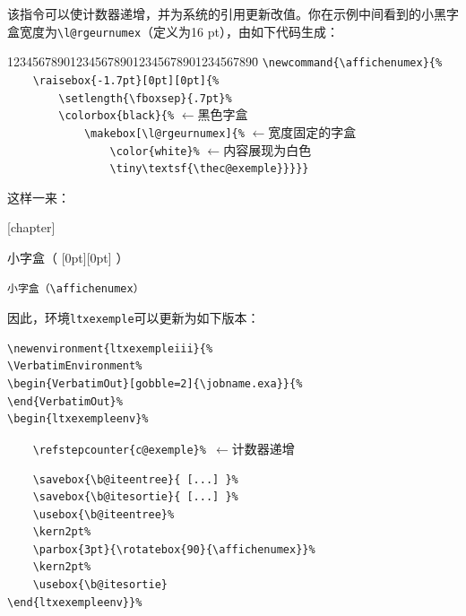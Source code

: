 该指令可以使计数器递增，并为系统的引用更新改值。你在示例中间看到的小黑字盒宽度为\verb|\l@rgeurnumex|（定义为16 pt），由如下代码生成：

\begin{dmd}
\begin{tabbing}
1234567890123456789012345678901234567890\= \kill
\verb|\newcommand{\affichenumex}{% |\\
\verb|    \raisebox{-1.7pt}[0pt][0pt]{% |\\
\verb|        \setlength{\fboxsep}{.7pt}% |\\
\verb|        \colorbox{black}{%|\> $\leftarrow$\textsf{黑色字盒}\\
\verb|            \makebox[\l@rgeurnumex]{%|\> $\leftarrow$\textsf{宽度固定的字盒}\\
\verb|                \color{white}%|\> $\leftarrow$\textsf{内容展现为白色}\\
\verb|                \tiny\textsf{\thec@exemple}}}}}|
\end{tabbing}
\end{dmd}

这样一来：

[chapter]
\renewcommand{\thecexemple}{%
\thechapter.\arabic{cexemple}}
\setcounter{cexemple}{34}

\newcommand{\affichenumex}{%
\raisebox{-1.7pt}[0pt][0pt]{%
\setlength{\fboxsep}{.7pt}%
\colorbox{black}{%
\makebox[16pt]{%
\color{white}%
\tiny\textsf{\thecexemple}}}}}

\begin{codelist}[11.34]{
小字盒（\affichenumex）
}\begin{verbatim}
小字盒（\affichenumex）
\end{verbatim}
\end{codelist}

因此，环境\verb|ltxexemple|可以更新为如下版本：

\begin{dmd}
\begin{verbatim}
\newenvironment{ltxexempleiii}{%
\VerbatimEnvironment%
\begin{VerbatimOut}[gobble=2]{\jobname.exa}}{%
\end{VerbatimOut}%
\begin{ltxexempleenv}% 
\end{verbatim}
\verb+    \refstepcounter{c@exemple}% +\quad$\leftarrow$\textsf{计数器递增}
\begin{verbatim}
    \savebox{\b@iteentree}{ [...] }% 
    \savebox{\b@itesortie}{ [...] }%
    \usebox{\b@iteentree}%
    \kern2pt%
    \parbox{3pt}{\rotatebox{90}{\affichenumex}}%
    \kern2pt%
    \usebox{\b@itesortie}
\end{ltxexempleenv}}%
\end{verbatim}
\end{dmd}

